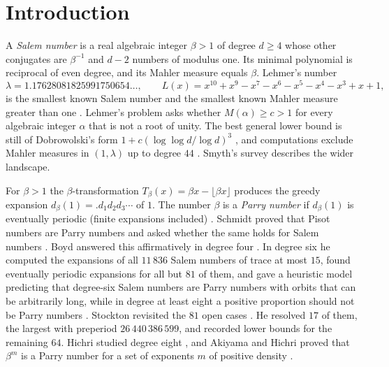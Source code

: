 \documentclass[11pt]{amsart}
\theoremstyle{definition}
\theoremstyle{remark}
\begin{document}
\section{Introduction}

A \emph{Salem number} is a real algebraic integer $\beta>1$ of degree $d\ge 4$ whose other conjugates are $\beta^{-1}$ and $d-2$ numbers of modulus one. Its minimal polynomial is reciprocal of even degree, and its Mahler measure equals $\beta$. Lehmer's number
\[
\lambda=1.17628081825991750654\ldots,\qquad L(x)=x^{10}+x^9-x^7-x^6-x^5-x^4-x^3+x+1,
\]
is the smallest known Salem number and the smallest known Mahler measure greater than one \cite{Lehmer}. Lehmer's problem asks whether $M(\alpha)\ge c>1$ for every algebraic integer $\alpha$ that is not a root of unity. The best general lower bound is still of Dobrowolski's form $1+c(\log\log d/\log d)^3$ \cite{Dobrowolski,Voutier}, and computations exclude Mahler measures in $(1,\lambda)$ up to degree $44$ \cite{MRW}. Smyth's survey \cite{SmythSurvey} describes the wider landscape.

For $\beta>1$ the $\beta$-transformation $T_\beta(x)=\beta x-\lfloor\beta x\rfloor$ produces the greedy expansion $d_\beta(1)=.d_1d_2d_3\cdots$ of $1$. The number $\beta$ is a \emph{Parry number} if $d_\beta(1)$ is eventually periodic (finite expansions included) \cite{Renyi,Parry}. Schmidt proved that Pisot numbers are Parry numbers and asked whether the same holds for Salem numbers \cite{Schmidt}. Boyd answered this affirmatively in degree four \cite{Boyd89}. In degree six he computed the expansions of all $11\,836$ Salem numbers of trace at most $15$, found eventually periodic expansions for all but $81$ of them, and gave a heuristic model predicting that degree-six Salem numbers are Parry numbers with orbits that can be arbitrarily long, while in degree at least eight a positive proportion should not be Parry numbers \cite{Boyd96}. Stockton revisited the $81$ open cases \cite{Stockton}. He resolved $17$ of them, the largest with preperiod $26\,440\,386\,599$, and recorded lower bounds for the remaining $64$. Hichri studied degree eight \cite{Hichri}, and Akiyama and Hichri proved that $\beta^m$ is a Parry number for a set of exponents $m$ of positive density \cite{AkiyamaHichri}.
\end{document}
